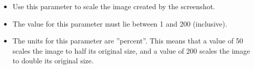 \begin{itemize}
\item Use this parameter to scale the image created by the screenshot.
\item The value for this parameter must lie between 1 and 200 (inclusive).
\item The units for this parameter are ''percent''. This means that a value of 50 scales the image to half its original size, and a value of 200 scales the image to double its original size.
\end{itemize}
